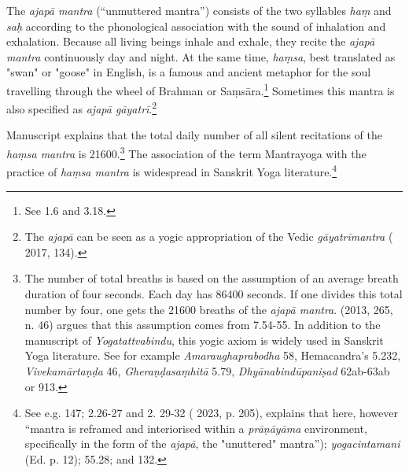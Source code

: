The \textit{ajapā mantra} (``unmuttered mantra'') consists of the two syllables \textit{haṃ} and \textit{saḥ} according to the phonological association with the sound of inhalation and exhalation. Because all living beings inhale and exhale, they recite the \textit{ajapā mantra} continuously day and night. At the same time, \textit{haṃsa}, best translated as "swan" or "goose" in English, is a famous and ancient metaphor for the soul travelling through the wheel of Brahman or Saṃsāra.\footnote{See  1.6 and 3.18.} Sometimes this mantra is also specified as \textit{ajapā gāyatrī}.\footnote{The \textit{ajapā} can be seen as a yogic appropriation of the Vedic \textit{gāyatrīmantra} ( 2017, 134).}  

Manuscript  explains that the total daily number of all silent recitations of the \textit{haṃsa mantra} is 21600.\footnote{The number of total breaths is based on the assumption of an average breath duration of four seconds. Each day has 86400 seconds. If one divides this total number by four, one gets the 21600 breaths of the \textit{ajapā mantra}. \citeauthor{birch2013} (2013, 265, n. 46) argues that this assumption comes from  7.54-55. In addition to the  manuscript of \textit{Yogatattvabindu}, this yogic axiom is widely used in Sanskrit Yoga literature. See for example \textit{Amaraughaprabodha} 58, Hemacandra's  5.232, \textit{Vivekamārtaṇḍa} 46, \textit{Gheraṇḍasaṃhitā} 5.79, \textit{Dhyānabindūpaniṣad} 62ab-63ab or  913.} The association of the term Mantrayoga with the practice of \textit{haṃsa mantra} is widespread in Sanskrit Yoga literature.\footnote{See e.g.  147;  2.26-27 and 2. 29-32 (\citeauthor{powell2023} 2023, p. 205), explains that here, however ``mantra is reframed and interiorised within a \textit{prāṇāyāma} environment, specifically in the form of the \textit{ajapā}, the "unuttered" mantra''); \emph{yogacintamani} (Ed. p. 12);  55.28; and  132.}

